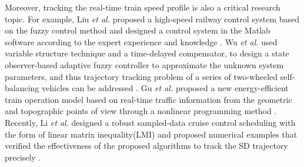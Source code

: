 \documentclass[journal]{IEEEtran}
\begin{document}
\par Moreover, tracking the real-time train speed profile is also a critical research topic. For example, Liu \emph{et al.} proposed a high-speed railway control system based on the fuzzy control method and designed a control system in the Matlab software according to the expert experience and knowledge \cite{liu2013high}. Wu \emph{et al.} used variable structure technique and a time-delayed compensator, to design a state observer-based adaptive fuzzy controller to approximate the unknown system parameters, and thus trajectory tracking problem of a series of two-wheeled self-balancing vehicles can be addressed \cite{wu2015trajectory}. Gu \emph{et al.} proposed a new energy-efficient train operation model based on real-time traffic information from the geometric and topographic points of view through a nonlinear programming method \cite{gu2014energy}. Recently, Li \emph{et al.} designed a robust sampled-data cruise control scheduling with the form of linear matrix inequality(LMI) and proposed numerical examples that verified the effectiveness of the proposed algorithms to track the SD trajectory precisely \cite{li2014robust}.
\end{document}

